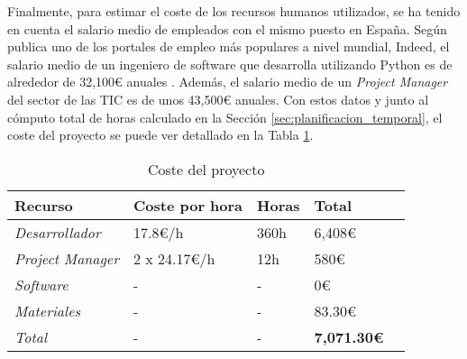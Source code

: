 \bigskip
Finalmente, para estimar el coste de los recursos
humanos utilizados, se ha tenido en cuenta el salario medio de empleados con el mismo puesto en España. Según publica
uno de los portales de empleo más populares a nivel mundial, Indeed, el salario medio de un ingeniero de software que desarrolla
utilizando Python es de alrededor de 32,100€ anuales \cite{indeedsalario}. Además, el salario medio de un \textit{Project Manager}
del sector de las TIC es de unos 43,500€ anuales. Con estos datos y junto al cómputo total de horas calculado en la Sección \ref{sec:planificacion_temporal},
el coste del proyecto se puede ver detallado en la Tabla \ref{tab:costes}.

\bigskip
\begin{table}[H]
	\centering
	\begin{tabular}{|l|l|l|l|l|}
		\rowcolor{udcpink!25}
		\hline
		\small \textbf{Recurso}         & \small \textbf{Coste por hora} & \small \textbf{Horas} & \small \textbf{Total}     \\ \hline
		\small \textit{Desarrollador}   & \small 17.8€/h                 & \small 360h           & \small 6,408€             \\ \hline
		\small \textit{Project Manager} & \small 2 x 24.17€/h            & \small 12h            & \small 580€               \\ \hline
		\small \textit{Software}        & \small -                       & \small -              & \small 0€                 \\ \hline
		\small \textit{Materiales}      & \small -                       & \small -              & \small 83.30€             \\ \hline
		\small \textit{Total}           & \small -                       & \small -              & \small \textbf{7,071.30€} \\ \hline
	\end{tabular}
	\caption{Coste del proyecto}
	\label{tab:costes}
\end{table}
